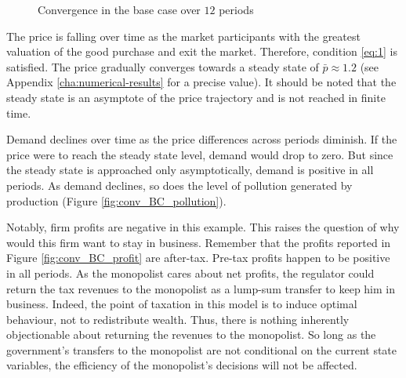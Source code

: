 \begin{figure}[]
{    \label{fig:conv_BC_pollution}
  } 
\caption{Convergence in the base case over $12$ periods}
\label{fig:conv_BC_plots}
\end{figure}

The price is falling over time as the market participants with the greatest
valuation of the good purchase and exit the market. Therefore, condition %
\eqref{eq:1} is satisfied. The price gradually converges towards a steady
state of $\bar{p}\approx 1.2$ (see Appendix \ref{cha:numerical-results} for
a precise value). It should be noted that the steady state is an asymptote
of the price trajectory and is not reached in finite time.

Demand declines over time as the price differences across periods diminish.
If the price were to reach the steady state level, demand would drop to
zero. But since the steady state is approached only asymptotically, demand
is positive in all periods. As demand declines, so does the level of
pollution generated by production (Figure \ref{fig:conv_BC_pollution}).

Notably, firm profits are negative in this example. This raises the question
of why would this firm want to stay in business. Remember that the profits
reported in Figure \ref{fig:conv_BC_profit} are after-tax. Pre-tax profits
happen to be positive in all periods. As the monopolist cares about net
profits, the regulator could return the tax revenues to the monopolist as a
lump-sum transfer to keep him in business. Indeed, the point of taxation in
this model is to induce optimal behaviour, not to redistribute wealth. Thus,
there is nothing inherently objectionable about returning the revenues to
the monopolist. So long as the government's transfers to the monopolist are
not conditional on the current state variables, the efficiency of the
monopolist's decisions will not be affected.

